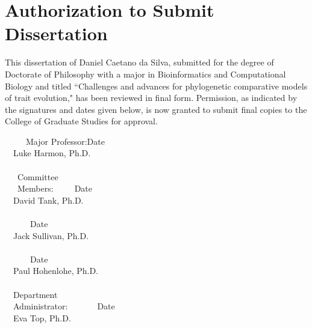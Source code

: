 \section*{\large{Authorization to Submit Dissertation}}
\begin{flushleft}
This dissertation of Daniel Caetano da Silva, submitted for the degree of Doctorate of Philosophy with a major in Bioinformatics and Computational Biology and titled ``Challenges and advances for phylogenetic comparative models of trait evolution," has been reviewed in final form. Permission, as indicated by the signatures and dates given below, is now granted to submit final copies to the College of Graduate Studies for approval.
\end{flushleft}
\begin{singlespace}
\ \ \ \ \ Major Professor:\indent\underline{\makebox[2.8in][l]{\ }}Date\underline{\makebox[1.2in][l]{\ }}\\
\ \ \indent\indent\indent\indent\indent\indent\indent Luke Harmon, Ph.D.\\
\ \\
\ \ \ \indent Committee\\
\ \ \ \indent Members:\indent\indent\ \ \ \ \ \underline{\makebox[2.8in][l]{\ }}Date\underline{\makebox[1.2in][l]{\ }}\\
\ \ \indent\indent\indent\indent\indent\indent\indent David Tank, Ph.D.\\
\ \\
\ \ \indent\indent\indent\indent\indent\indent\ \ \ \ \underline{\makebox[2.8in][l]{\ }}Date\underline{\makebox[1.2in][l]{\ }}\\
\ \ \indent\indent\indent\indent\indent\indent\indent Jack Sullivan, Ph.D.\\
\ \\
\ \ \indent\indent\indent\indent\indent\indent\ \ \ \ \underline{\makebox[2.8in][l]{\ }}Date\underline{\makebox[1.2in][l]{\ }}\\
\ \ \indent\indent\indent\indent\indent\indent\indent Paul Hohenlohe, Ph.D.\\
\ \\
\ \ \indent Department\\
\ \ \indent Administrator:\ \ \ \ \ \ \ \underline{\makebox[2.8in][l]{\ }}Date\underline{\makebox[1.2in][l]{\ }}\\
\ \ \indent\indent\indent\indent\indent\indent\indent Eva Top, Ph.D.\\

\end{singlespace}
\pagebreak

